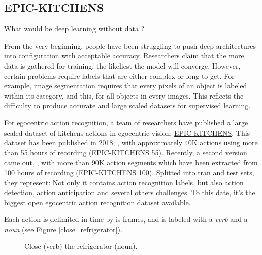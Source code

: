 \documentclass[12pt, a4paper]{report}
\begin{document}
			\subsection{EPIC-KITCHENS}
				What would be deep learning without data ?
				\par
				From the very beginning, people have been struggling to push deep architectures into configuration with acceptable accuracy.
				Researchers claim that the more data is gathered for training, the likeliest the model will converge.
				However, certain problems require labels that are either complex or long to get.
				For example, image segmentation requires that every pixels of an object is labeled within its category, and this, for all objects in every images.
				This reflects the difficulty to produce accurate and large scaled datasets for supervised learning.
				\par
				For egocentric action recognition, a team of researchers have published a large scaled dataset of kitchens actions in egocentric vision: \href{https://epic-kitchens.github.io/2021}{EPIC-KITCHENS}.
				This dataset has been published in 2018, \cite{damen2018scaling}, with approximately 40K actions using more than 55 hours of recording (EPIC-KITCHENS 55).
				Recently, a second version came out, \cite{damen2020rescaling}, with more than 90K action segments which have been extracted from 100 hours of recording (EPIC-KITCHENS 100).
				Splitted into tran and test sets, they represent: 
				Not only it contains action recognition labels, but also action detection, action anticipation and several others challenges.
				To this date, it's the biggest open egocentric action recognition dataset available.
				\par
				Each action is delimited in time by is frames, and is labeled with a {\itshape verb} and a {\itshape noun} (see Figure \ref{close_refrigerator}).
				\begin{figure}[h!]
					\centering
					\caption{Close ({\small verb}) the refrigerator ({\small noun}).}
				\end{figure}
\end{document}
